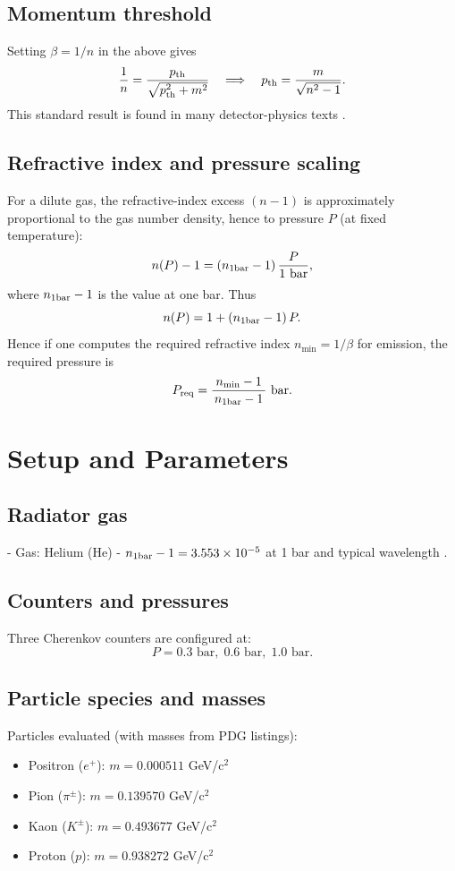 \documentclass[11pt,a4paper]{article}
\begin{document}
\subsection{Momentum threshold}
Setting $\beta = 1/n$ in the above gives
\[
\frac{1}{n} = \frac{p_{\rm th}}{\sqrt{p_{\rm th}^2 + m^2}}
\quad\Longrightarrow\quad
p_{\rm th} = \frac{m}{\sqrt{n^2 - 1}}.
\]
This standard result is found in many detector-physics texts \cite{Leo1994,Knoll2010,PDG2024}.

\subsection{Refractive index and pressure scaling}
For a dilute gas, the refractive-index excess $(n-1)$ is approximately proportional to the gas number density, hence to pressure $P$ (at fixed temperature):
\[
n(P) - 1 = (n_{1\rm bar}-1)\,\frac{P}{1 \text{ bar}}, 
\]
where $n_{1\rm bar}-1$ is the value at one bar. Thus
\[
n(P) = 1 + (n_{1\rm bar}-1)\,P.
\]
Hence if one computes the required refractive index $n_{\min} = 1/\beta$ for emission, the required pressure is
\[
P_{\rm req} = \frac{n_{\min} - 1}{\,n_{1\rm bar}-1\,} \text{ bar}.
\]

\section{Setup and Parameters}
\subsection{Radiator gas}
- Gas: Helium (He)  
- $n_{1\rm bar} - 1 = 3.553 \times 10^{-5}$ at 1 bar and typical wavelength \cite{Palinkas2008}.

\subsection{Counters and pressures}
Three Cherenkov counters are configured at:
\[
P = 0.3 \text{ bar},\;0.6 \text{ bar},\;1.0 \text{ bar}.
\]

\subsection{Particle species and masses}
Particles evaluated (with masses from PDG listings):
\begin{itemize}
  \item Positron ($e^+$): $m = 0.000511$ GeV/c$^2$ \cite{PDG2024}  
  \item Pion ($\pi^\pm$): $m = 0.139570$ GeV/c$^2$ \cite{PDG2024}  
  \item Kaon ($K^\pm$): $m = 0.493677$ GeV/c$^2$ \cite{PDG2024}  
  \item Proton ($p$): $m = 0.938272$ GeV/c$^2$ \cite{PDG2024}  
\end{itemize}
\end{document}
